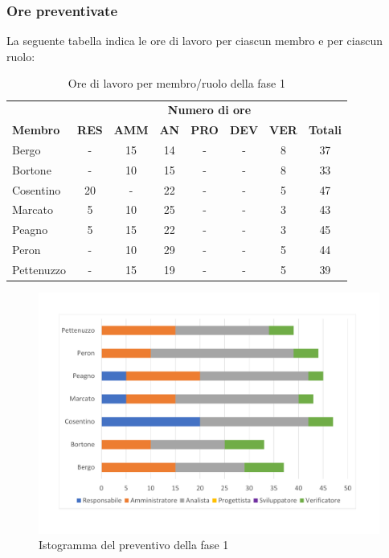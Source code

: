 	\subsubsection{Ore preventivate}
		La seguente tabella indica le ore di lavoro per ciascun membro e per ciascun ruolo:
		\begin{table}[H]
			\centering
			\begin{tabular}{| l | c c c c c c | c |}
				\rowcolor{LightBlue}
				& \multicolumn{7}{c}{\textbf{\color{white}Numero di ore}}	\\
	
				\rowcolor{LightBlue}
				\textbf{\color{white}Membro}
				& \textbf{\color{white}RES}
				& \textbf{\color{white}AMM}
				& \textbf{\color{white}AN}
				& \textbf{\color{white}PRO}
				& \textbf{\color{white}DEV}
				& \textbf{\color{white}VER}
				& \textbf{\color{white}Totali}\\
	
				Bergo 				& - & 15 & 14 & - & - & 8 & 37\\
				Bortone 			& - & 10 & 15	& - & - & 8 & 33\\
				Cosentino 		& 20 & - & 22 & - & - & 5 & 47\\
				Marcato 			& 5 & 10 & 25 & - & - & 3 & 43\\
				Peagno 			& 5 & 15 & 22 & - & - & 3 & 45\\
				Peron 				& - & 10 & 29 & - & - & 5 & 44\\
				Pettenuzzo 	& - & 15 & 19 & - & - & 5 & 39\\ \hline
			\end{tabular}
			\caption{Ore di lavoro per membro/ruolo della fase 1}
		\end{table}
		
	\begin{figure}[H]
	\centering
	\includegraphics[scale=0.45]{images/preventivoRR.pdf}
	\caption{Istogramma del preventivo della fase 1}
\end{figure}
		
